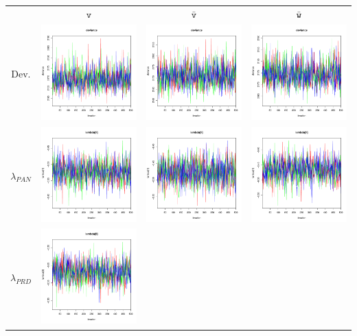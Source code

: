 \documentclass[letter,12pt]{article}
\begin{document}
\begin{table}
\centering
\begin{tabular}{cccc}
                     & $\texttt{v}$ & $\bar{\texttt{v}}$ & $\bar{\texttt{w}}$ \\ 
    Dev.             & \includegraphics[width=.15\columnwidth]{../graphs/traceplots/2012d0v_1.pdf} &
                        \includegraphics[width=.15\columnwidth]{../graphs/traceplots/2012d0vbar_1.pdf} &
                         \includegraphics[width=.15\columnwidth]{../graphs/traceplots/2012d0wbar_1.pdf} \\
    $\lambda_{PAN}$   & \includegraphics[width=.15\columnwidth]{../graphs/traceplots/2012d0v_2.pdf} &
                        \includegraphics[width=.15\columnwidth]{../graphs/traceplots/2012d0vbar_2.pdf} &
                         \includegraphics[width=.15\columnwidth]{../graphs/traceplots/2012d0wbar_2.pdf} \\
    $\lambda_{PRD}$   & \includegraphics[width=.15\columnwidth]{../graphs/traceplots/2012d0v_3.pdf} &

\end{tabular}
\end{table}
\end{document}
